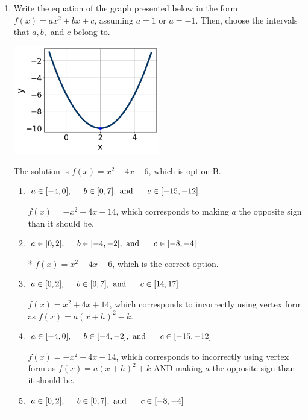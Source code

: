 \documentclass{extbook}[14pt]
\newcommand{\litem}[1]{\item #1

\rule{\textwidth}{0.4pt}}
\begin{document}
\begin{enumerate}\litem{
Write the equation of the graph presented below in the form $f(x)=ax^2+bx+c$, assuming  $a=1$ or $a=-1$. Then, choose the intervals that $a, b,$ and $c$ belong to.

\begin{center}
    \includegraphics[width=0.5\textwidth]{../Figures/quadraticGraphToEquationB.png}
\end{center}


The solution is \( f(x) = x^{2} -4 x -6 \), which is option B.\begin{enumerate}[label=\Alph*.]
\item \( a \in [-4, 0], \hspace*{5mm} b \in [0, 7], \text{ and } \hspace*{5mm} c \in [-15, -12] \)

$f(x)=-x^{2} +4 x -14$, which corresponds to making $a$ the opposite sign than it should be.
\item \( a \in [0, 2], \hspace*{5mm} b \in [-4, -2], \text{ and } \hspace*{5mm} c \in [-8, -4] \)

* $f(x)=x^{2} -4 x -6$, which is the correct option.
\item \( a \in [0, 2], \hspace*{5mm} b \in [0, 7], \text{ and } \hspace*{5mm} c \in [14, 17] \)

$f(x)=x^{2} +4 x + 14$, which corresponds to incorrectly using vertex form as $f(x) = a(x+h)^2 - k$.
\item \( a \in [-4, 0], \hspace*{5mm} b \in [-4, -2], \text{ and } \hspace*{5mm} c \in [-15, -12] \)

$f(x)=-x^{2} -4 x -14$, which corresponds to incorrectly using vertex form as $f(x) = a(x+h)^2+k$ AND making $a$ the opposite sign than it should be.
\item \( a \in [0, 2], \hspace*{5mm} b \in [0, 7], \text{ and } \hspace*{5mm} c \in [-8, -4] \)


\end{enumerate}}
\end{enumerate}
\end{document}
